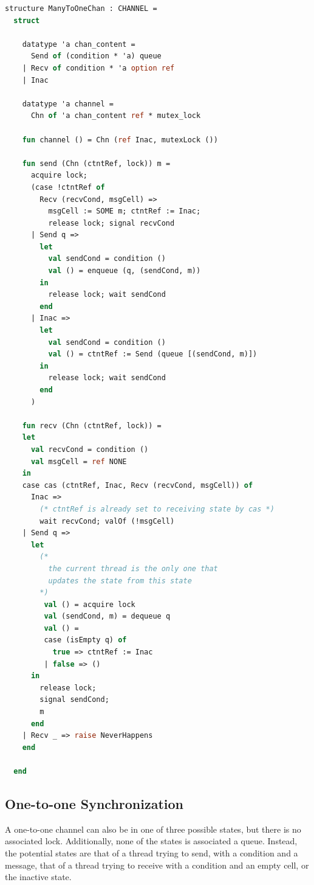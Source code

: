 \documentclass[letterpaper, 11pt]{extarticle}
\begin{document}
\begin{lstlisting}[language=ML, mathescape]
  structure ManyToOneChan : CHANNEL =
  struct

    datatype 'a chan_content =
      Send of (condition * 'a) queue
    | Recv of condition * 'a option ref
    | Inac

    datatype 'a channel =
      Chn of 'a chan_content ref * mutex_lock

    fun channel () = Chn (ref Inac, mutexLock ())

    fun send (Chn (ctntRef, lock)) m = 
      acquire lock;
      (case !ctntRef of
        Recv (recvCond, msgCell) => 
          msgCell := SOME m; ctntRef := Inac;
          release lock; signal recvCond
      | Send q =>
        let
          val sendCond = condition ()
          val () = enqueue (q, (sendCond, m))
        in
          release lock; wait sendCond
        end
      | Inac =>
        let
          val sendCond = condition ()
          val () = ctntRef := Send (queue [(sendCond, m)])
        in
          release lock; wait sendCond
        end 
      )
    
    fun recv (Chn (ctntRef, lock)) =
    let
      val recvCond = condition () 
      val msgCell = ref NONE 
    in
    case cas (ctntRef, Inac, Recv (recvCond, msgCell)) of
      Inac =>
        (* ctntRef is already set to receiving state by cas *)
        wait recvCond; valOf (!msgCell)
    | Send q =>
      let
        (*
          the current thread is the only one that
          updates the state from this state
        *)
         val () = acquire lock
         val (sendCond, m) = dequeue q 
         val () =
         case (isEmpty q) of
           true => ctntRef := Inac
         | false => ()
      in
        release lock;
        signal sendCond;
        m
      end
    | Recv _ => raise NeverHappens
    end
          
  end

\end{lstlisting}

\subsection{One-to-one Synchronization}

A one-to-one channel can also be in one of three possible states, but there is no associated
lock. Additionally, none of the states is associated a queue. Instead, the potential states are
that of a thread trying to send, with a condition and a message, that of a
thread trying to receive with a condition and an empty cell, or the inactive state.
\end{document}
